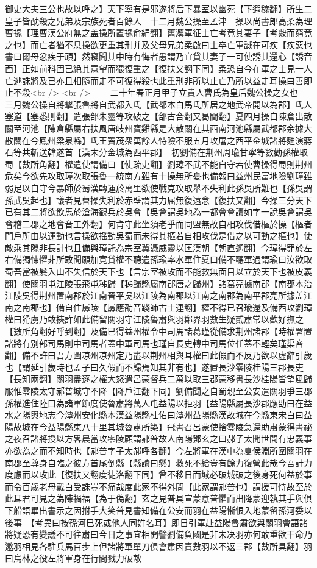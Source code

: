 御史大夫三公也故以呼之】天下寧有是邪遂將后下暴室以幽死【下遐稼翻】所生二皇子皆酖殺之兄弟及宗族死者百餘人　十二月魏公操至孟津　操以尚書郎高柔為理曹掾【理曹漢公府無之盖操所置掾俞絹翻】舊灋軍征士亡考竟其妻子【考覈而窮竟之也】而亡者猶不息操欲更重其刑并及父母兄弟柔啟曰士卒亡軍誠在可疾【疾惡也書曰爾母忿疾于頑】然竊聞其中時有悔者愚謂乃宜貸其妻子一可使誘其還心【誘音酉】正如前科固已絶其意望而猥復重之【復扶又翻下同】柔恐自今在軍之士見一人亡逃誅將及已亦且相隨而走不可復得殺也此重刑非所以止亡乃所以益走耳操曰善即止不殺<br />
<br />
　　二十年春正月甲子立貴人曹氏為皇后魏公操之女也　三月魏公操自將擊張魯將自武都入氐【武都本白馬氐所居之地武帝開以為郡】氐人塞道【塞悉則翻】遣張郃朱靈等攻破之【郃古合翻又曷閤翻】夏四月操自陳倉出散關至河池【陳倉縣屬右扶風唐岐州寶雞縣是大散關在其西南河池縣屬武都郡余據大散關在今鳳州梁泉縣】氐王竇茂衆萬餘人恃險不服五月攻屠之西平金城諸將麯演蔣石等共斬送韓遂首【漢末分金城為西平郡】　初劉備在荆州周瑜甘寧等數勸孫權取蜀【數所角翻】權遣使謂備曰【使疏吏翻】劉璋不武不能自守若使曹操得蜀則荆州危矣今欲先攻取璋次取張魯一統南方雖有十操無所憂也備報曰益州民富地險劉璋雖弱足以自守今暴師於蜀漢轉運於萬里欲使戰克攻取舉不失利此孫吳所難也【孫吳謂孫武吳起也】議者見曹操失利於赤壁謂其力屈無復遠念【復扶又翻】今操三分天下已有其二將欲飲馬於滄海觀兵於吳會【吳會謂吳地為一都會會讀如字一說吳會謂吳會稽二郡之地會音工外翻】何肯守此坐須老乎而同盟無故自相攻伐借樞於操【樞者門戶所由以運動也言操欲揺動吳蜀而未得其樞若自相攻伐是借之以可動之樞也】使敵乘其隙非長計也且備與璋託為宗室冀憑威靈以匡漢朝【朝直遙翻】今璋得罪於左右備獨悚懼非所敢聞願加寛貸權不聽遣孫瑜率水軍住夏口備不聽軍過謂瑜曰汝欲取蜀吾當被髪入山不失信於天下也【言宗室被攻而不能救無面目以立於天下也被皮義翻】使關羽屯江陵張飛屯秭歸【秭歸縣屬南郡唐之歸州】諸葛亮據南郡【南郡本治江陵吳得荆州置南郡於江南晉平吳以江陵為南郡以江南之南郡為南平郡亮所據盖江南之南郡也】備自住孱陵【孱應劭音踐師古士連翻】權不得已召瑜還及備西攻劉璋權曰猾虜乃敢挾詐如此備留關羽守江陵魯肅與羽鄰界羽數生疑貳肅常以歡好撫之【數所角翻好呼到翻】及備巳得益州權令中司馬諸葛瑾從備求荆州諸郡【時權署置諸將有别部司馬則中司馬者蓋中軍司馬也瑾自長史轉中司馬位任蓋不輕矣瑾渠吝翻】備不許曰吾方圖凉州凉州定乃盡以荆州相與耳權曰此假而不反乃欲以虚辭引歲也【謂延引歲時也孟子曰久假而不歸焉知其非有也】遂置長沙零陵桂陽三郡長吏【長知兩翻】關羽盡逐之權大怒遣呂蒙督兵二萬以取三郡蒙移書長沙桂陽皆望風歸服惟零陵太守郝普城守不降【降戶江翻下同】劉備聞之自蜀親至公安遣關羽爭三郡孫權進住陸口為諸軍節度使魯肅將萬人屯益陽以拒羽【益陽縣屬長沙郡應劭曰在益水之陽輿地志今潭州安化縣本漢益陽縣杜佑曰潭州益陽縣漢故城在今縣東宋白曰益陽故城在今益陽縣東八十里其城魯肅所築】飛書召呂蒙使捨零陵急還助肅蒙得書祕之夜召諸將授以方畧晨當攻零陵顧謂郝普故人南陽鄧玄之曰郝子太聞世間有忠義事亦欲為之而不知時也【郝普字子太郝呼各翻】今左將軍在漢中為夏侯淵所圍關羽在南郡至尊身自臨之彼方首尾倒縣【縣讀曰懸】救死不給豈有餘力復營此哉今吾計力度慮而以攻此【復扶又翻度徒洛翻下同】曾不移日而城必破城破之後身死何益於事而令百歲老母戴白受誅豈不痛哉度此家不得外問【此家謂郝普也】謂援可恃故至於此耳君可見之為陳禍福【為于偽翻】玄之見普具宣蒙意普懼而出降蒙迎執其手與俱下船語畢出書示之因拊手大笑普見書知備在公安而羽在益陽慚恨入地蒙留孫河委以後事　【考異曰按孫河巳死或他人同姓名耳】即日引軍赴益陽魯肅欲與關羽會語諸將疑恐有變議不可往肅曰今日之事宜相開譬劉備負國是非未决羽亦何敢重欲干命乃邀羽相見各駐兵馬百步上但諸將軍單刀俱會肅因責數羽以不返三郡【數所具翻】羽曰烏林之役左將軍身在行間戮力破敵
